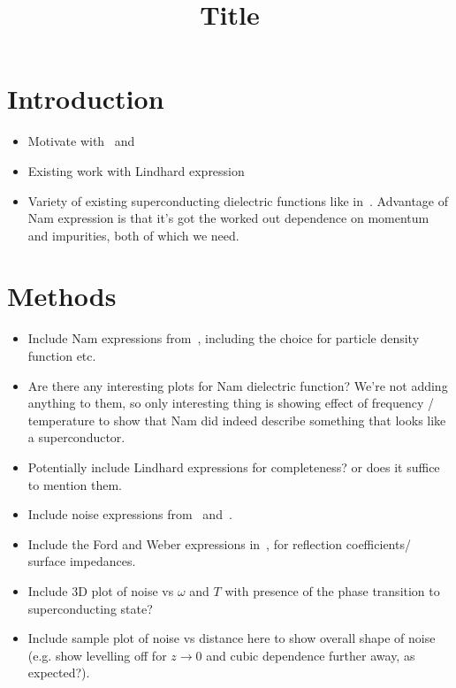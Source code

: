 \documentclass{article}
\title{Title}
\begin{document}
\maketitle

\section{Introduction \label{sec:intro}}
\begin{itemize}
	\item Motivate with~\cite{Tenberg2019} and~\cite{Kolkowitz2015}
	\item Existing work with Lindhard expression~\cite{QubitRelax}
	\item Variety of existing superconducting dielectric functions like in~\cite{AGD, llv9, Zimmermann1991, Mattis, Tinkham}.
	Advantage of Nam expression\cite{Nam1967} is that it's got the worked out dependence on momentum and impurities, both of which we need.
\end{itemize}
\section{Methods \label{sec:methods}}

\begin{itemize}
	\item Include Nam expressions from~\cite{Nam1967}, including the choice for particle density function etc.
	\item Are there any interesting plots for Nam dielectric function?
	We're not adding anything to them, so only interesting thing is showing effect of frequency / temperature to show that Nam did indeed describe something that looks like a superconductor.
	\item Potentially include Lindhard expressions for completeness? or does it suffice to mention them.
	\item Include noise expressions from~\cite{QubitRelax} and~\cite{Henkel1999}.
	\item Include the Ford and Weber expressions in~\cite{Ford1984}, for reflection coefficients/ surface impedances.
	\item Include 3D plot of noise vs $\omega$ and $T$ with presence of the phase transition to superconducting state?
	\item Include sample plot of noise vs distance here to show overall shape of noise (e.g. show levelling off for $z \rightarrow 0$ and cubic dependence further away, as expected?).
\end{itemize}
\end{document}
